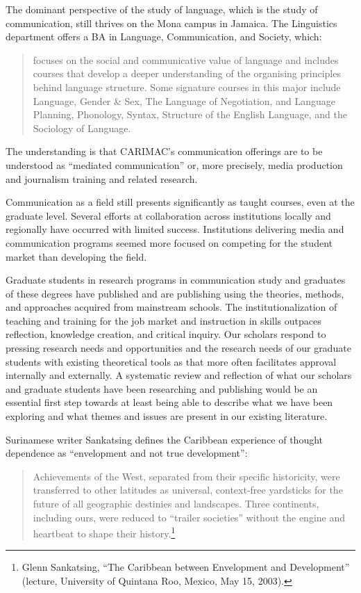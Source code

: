 \documentclass{tufte-handout}
\begin{document}
The dominant perspective of the study of language, which is the study of
communication, still thrives on the Mona campus in Jamaica. The
Linguistics department offers a BA in Language, Communication, and
Society, which:

\begin{quote}
focuses on the social and communicative value of language and includes
courses that develop a deeper understanding of the organising principles
behind language structure. Some signature courses in this major include
Language, Gender \& Sex, The Language of Negotiation, and Language
Planning, Phonology, Syntax, Structure of the English Language, and the
Sociology of Language.
\end{quote}

\noindent The understanding is that CARIMAC's communication offerings are to be
understood as ``mediated communication'' or, more precisely, media
production and journalism training and related research.

Communication as a field still presents significantly as taught courses,
even at the graduate level. Several efforts at collaboration across
institutions locally and regionally have occurred with limited success.
Institutions delivering media and communication programs seemed more
focused on competing for the student market than developing the field.

Graduate students in research programs in communication study and
graduates of these degrees have published and are publishing using the
theories, methods, and approaches acquired from mainstream schools. The
institutionalization of teaching and training for the job market and
instruction in skills outpaces reflection, knowledge creation, and
critical inquiry. Our scholars respond to pressing research needs and
opportunities and the research needs of our graduate students with
existing theoretical tools as that more often facilitates approval
internally and externally. A systematic review and reflection of what
our scholars and graduate students have been researching and publishing
would be an essential first step towards at least being able to describe
what we have been exploring and what themes and issues are present in
our existing literature.

Surinamese writer Sankatsing defines the Caribbean experience of thought
dependence as ``envelopment and not true development'':

\begin{quote}
Achievements of the West, separated from their specific historicity,
were transferred to other latitudes as universal, context-free
yardsticks for the future of all geographic destinies and landscapes.
Three continents, including ours, were reduced to ``trailer societies''
without the engine and heartbeat to shape their history.\footnote{Glenn
  Sankatsing, ``The Caribbean between Envelopment and Development''
  (lecture, University of Quintana Roo, Mexico, May 15, 2003).}
\end{quote}
\end{document}
